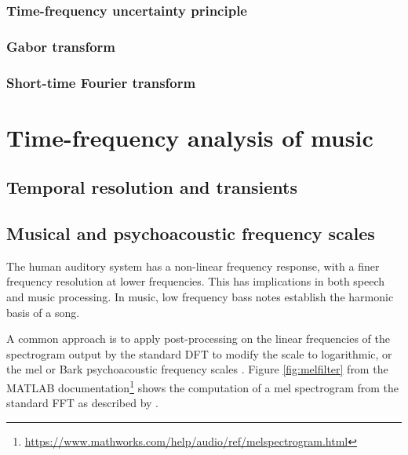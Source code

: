 \documentclass[letter,12pt,notitlepage]{article}
\begin{document}
\subsubsection{Time-frequency uncertainty principle}

\subsubsection{Gabor transform}

\subsubsection{Short-time Fourier transform}

\vfill
\clearpage

\section{Time-frequency analysis of music}
\label{sec:theorymusic}

\subsection{Temporal resolution and transients}
\label{sec:freqscales}

\subsection{Musical and psychoacoustic frequency scales}
\label{sec:freqscales}




The human auditory system has a non-linear frequency response, with a finer frequency resolution at lower frequencies.  This has implications in both speech and music processing. In music, low frequency bass notes establish the harmonic basis of a song. 


A common approach is to apply post-processing on the linear frequencies of the spectrogram output by the standard DFT to modify the scale to logarithmic, or the mel or Bark psychoacoustic frequency scales . Figure \ref{fig:melfilter} from the MATLAB documentation\footnote{\href{https://www.mathworks.com/help/audio/ref/melspectrogram.html}{https://www.mathworks.com/help/audio/ref/melspectrogram.html}} shows the computation of a mel spectrogram from the standard FFT as described by \citet[463]{melbook}.
\end{document}
